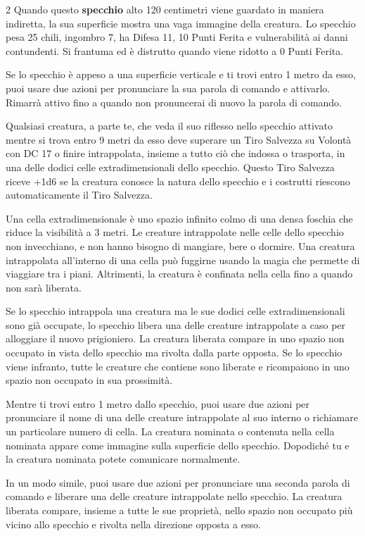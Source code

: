 \begin{multicols}{2}
Quando questo \textbf{specchio} alto 120 centimetri viene guardato in maniera indiretta, la sua superficie mostra una vaga immagine della creatura. Lo specchio pesa 25 chili, ingombro 7, ha Difesa 11, 10 Punti Ferita e vulnerabilità ai danni contundenti. Si frantuma ed è distrutto quando viene ridotto a 0 Punti Ferita.

Se lo specchio è appeso a una superficie verticale e ti trovi entro 1 metro da esso, puoi usare due azioni per pronunciare la sua parola di comando e attivarlo. Rimarrà attivo fino a quando non pronuncerai di nuovo la parola di comando.

Qualsiasi creatura, a parte te, che veda il suo riflesso nello specchio attivato mentre si trova entro 9 metri da esso deve superare un Tiro Salvezza su Volontà con DC 17 o finire intrappolata, insieme a tutto ciò che indossa o trasporta, in una delle dodici celle extradimensionali dello specchio. Questo Tiro Salvezza riceve +1d6 se la creatura conosce la natura dello specchio e i costrutti riescono automaticamente il Tiro Salvezza.

Una cella extradimensionale è uno spazio infinito colmo di una densa foschia che riduce la visibilità a 3 metri. Le creature intrappolate nelle celle dello specchio non invecchiano, e non hanno bisogno di mangiare, bere o dormire. Una creatura intrappolata all'interno di una cella può fuggirne usando la magia che permette di viaggiare tra i piani. Altrimenti, la creatura è confinata nella cella fino a quando non sarà liberata.

Se lo specchio intrappola una creatura ma le sue dodici celle extradimensionali sono già occupate, lo specchio libera una delle creature intrappolate a caso per alloggiare il nuovo prigioniero. La creatura liberata compare in uno spazio non occupato in vista dello specchio ma rivolta dalla parte opposta. Se lo specchio viene infranto, tutte le creature che contiene sono liberate e ricompaiono in uno spazio non occupato in sua prossimità.

Mentre ti trovi entro 1 metro dallo specchio, puoi usare due azioni per pronunciare il nome di una delle creature intrappolate al suo interno o richiamare un particolare numero di cella. La creatura nominata o contenuta nella cella nominata appare come immagine sulla superficie dello specchio. Dopodiché tu e la creatura nominata potete comunicare normalmente.

In un modo simile, puoi usare due azioni per pronunciare una seconda parola di comando e liberare una delle creature intrappolate nello specchio. La creatura liberata compare, insieme a tutte le sue proprietà, nello spazio non occupato più vicino allo specchio e rivolta nella direzione opposta a esso.


\end{multicols}
